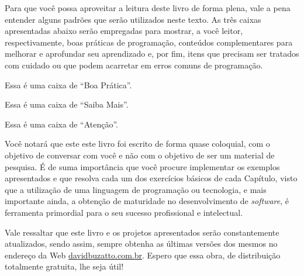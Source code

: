 Para que você possa aproveitar a leitura deste livro de forma plena, vale a pena entender alguns padrões que serão utilizados neste texto. As três caixas apresentadas abaixo serão empregadas para mostrar, a você leitor, respectivamente, boas práticas de programação, conteúdos complementares para melhorar e aprofundar seu aprendizado e, por fim, itens que precisam ser tratados com cuidado ou que podem acarretar em erros comuns de programação.

\begin{boaPratica}
    Essa é uma caixa de ``Boa Prática''.
\end{boaPratica}

\begin{saibaMais}
    Essa é uma caixa de ``Saiba Mais''.
\end{saibaMais}

\begin{atencao}
    Essa é uma caixa de ``Atenção''.
\end{atencao}

Você notará que este este livro foi escrito de forma quase coloquial, com o objetivo de conversar com você e não com o objetivo de ser um material de pesquisa. É de suma importância que você procure implementar os exemplos apresentados e que resolva cada um dos exercícios básicos de cada Capítulo, visto que a utilização de uma linguagem de programação ou tecnologia, e mais importante ainda, a obtenção de maturidade no desenvolvimento de \textit{software}, é ferramenta primordial para o seu sucesso profissional e intelectual.

Vale ressaltar que este livro e os projetos apresentados serão constantemente atualizados, sendo assim, sempre obtenha as últimas versões dos mesmos no endereço da Web \textcolor{corAzulTema}{\href{http://davidbuzatto.com.br}{davidbuzatto.com.br}}. Espero que essa obra, de distribuição totalmente gratuita, lhe seja útil!

\vspace*{\fill}

